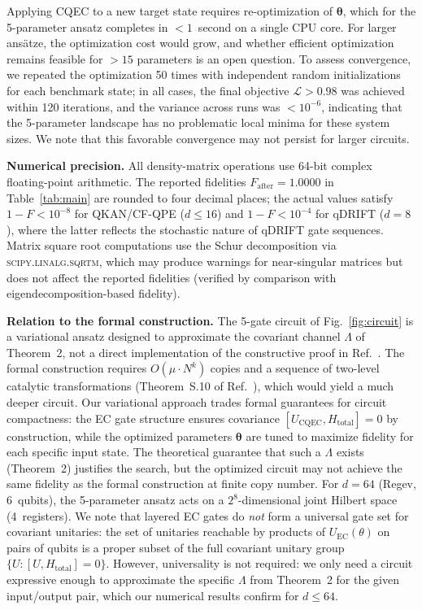 \documentclass[prx,twocolumn,superscriptaddress,longbibliography,floatfix]{revtex4-2}
\begin{document}
Applying CQEC to a new target state requires re-optimization of $\boldsymbol{\theta}$, which for the 5-parameter ansatz completes in $< 1$~second on a single CPU core.
For larger ansätze, the optimization cost would grow, and whether efficient optimization remains feasible for $> 15$ parameters is an open question.
To assess convergence, we repeated the optimization 50 times with independent random initializations for each benchmark state; in all cases, the final objective $\mathcal{L} > 0.98$ was achieved within 120 iterations, and the variance across runs was $< 10^{-6}$, indicating that the 5-parameter landscape has no problematic local minima for these system sizes.
We note that this favorable convergence may not persist for larger circuits.

\textbf{Numerical precision.}
All density-matrix operations use 64-bit complex floating-point arithmetic.
The reported fidelities $F_\mathrm{after} = 1.0000$ in Table~\ref{tab:main} are rounded to four decimal places; the actual values satisfy $1 - F < 10^{-8}$ for QKAN/CF-QPE ($d \leq 16$) and $1 - F < 10^{-4}$ for qDRIFT ($d = 8$), where the latter reflects the stochastic nature of qDRIFT gate sequences.
Matrix square root computations use the Schur decomposition via \textsc{scipy.linalg.sqrtm}, which may produce warnings for near-singular matrices but does not affect the reported fidelities (verified by comparison with eigendecomposition-based fidelity).

\textbf{Relation to the formal construction.}
The 5-gate circuit of Fig.~\ref{fig:circuit} is a variational ansatz designed to approximate the covariant channel $\Lambda$ of Theorem~2, not a direct implementation of the constructive proof in Ref.~\cite{Shiraishi2024}.
The formal construction requires $O(\mu \cdot N^k)$ copies and a sequence of two-level catalytic transformations (Theorem~S.10 of Ref.~\cite{Shiraishi2024}), which would yield a much deeper circuit.
Our variational approach trades formal guarantees for circuit compactness: the EC gate structure ensures covariance $[U_\mathrm{CQEC}, H_\mathrm{total}] = 0$ by construction, while the optimized parameters $\boldsymbol{\theta}$ are tuned to maximize fidelity for each specific input state.
The theoretical guarantee that such a $\Lambda$ exists (Theorem~2) justifies the search, but the optimized circuit may not achieve the same fidelity as the formal construction at finite copy number.
For $d = 64$ (Regev, 6~qubits), the 5-parameter ansatz acts on a $2^8$-dimensional joint Hilbert space (4~registers).
We note that layered EC gates do \emph{not} form a universal gate set for covariant unitaries: the set of unitaries reachable by products of $U_\mathrm{EC}(\theta)$ on pairs of qubits is a proper subset of the full covariant unitary group $\{U : [U, H_\mathrm{total}] = 0\}$.
However, universality is not required: we only need a circuit expressive enough to approximate the specific $\Lambda$ from Theorem~2 for the given input/output pair, which our numerical results confirm for $d \leq 64$.
\end{document}
